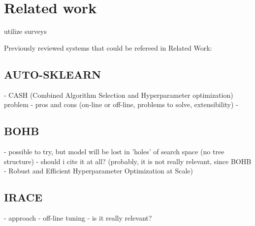 \chapter{Related work}\label{relwork}
utilize surveys 


Previously reviewed systems that could be refereed in Related Work: 
\section{AUTO-SKLEARN}
- CASH (Combined Algorithm Selection and Hyperparameter optimization) problem
- pros and cons (on-line or off-line, problems to solve, extensibility)
- \cite{autosklearn:feurer2015efficient}

\section{BOHB}
- possible to try, but model will be lost in 'holes' of search space (no tree structure)
- should i cite it at all? (probably, it is not really relevant, since BOHB - Robust and Efficient Hyperparameter Optimization at Scale)

\section{IRACE}
- approach \cite{irace:lopez2016irace}
- off-line tuning
- is it really relevant?

